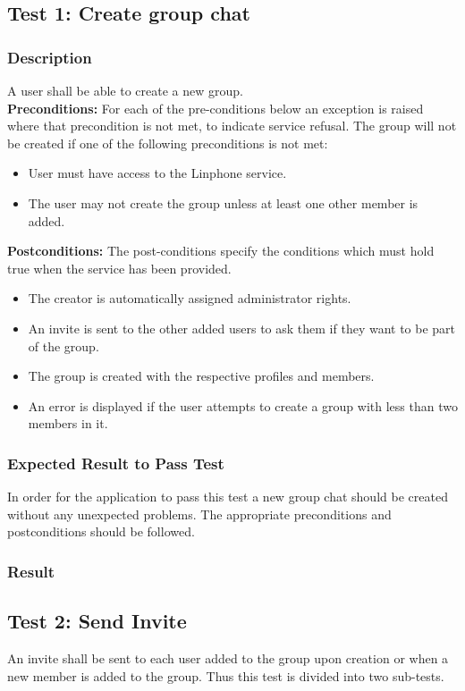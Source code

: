 \documentclass[11pt]{article}
\begin{document}
\subsection{Test 1: Create group chat}
\subsubsection{Description}
A user shall be able to create a new group.\\
\textbf{Preconditions:} For each of the pre-conditions below an exception is raised where that precondition is not met, to indicate service refusal.
The group will not be created if one of the following preconditions is not met:
\begin{itemize}
\item User must have access to the Linphone service.
\item The user may not create the group unless at least one other member is added.
\end{itemize}
\textbf{Postconditions:} The post-conditions specify the conditions which must hold true when the service has been provided.
\begin{itemize}
\item The creator is automatically assigned administrator rights.
\item An invite is sent to the other added users to ask them if they want to be part of the group.
\item The group is created with the respective profiles and members.
\item An error is displayed if the user attempts to create a group with less than two members in it.
\end{itemize}

\subsubsection{Expected Result to Pass Test}
In order for the application to pass this test a new group chat should be created without any unexpected problems. The appropriate preconditions and postconditions should be followed.
\subsubsection{Result}


\subsection{Test 2: Send Invite}
An invite shall be sent to each user added to the group upon creation or when a new member is added to the group. Thus this test is divided into two sub-tests.
\end{document}
